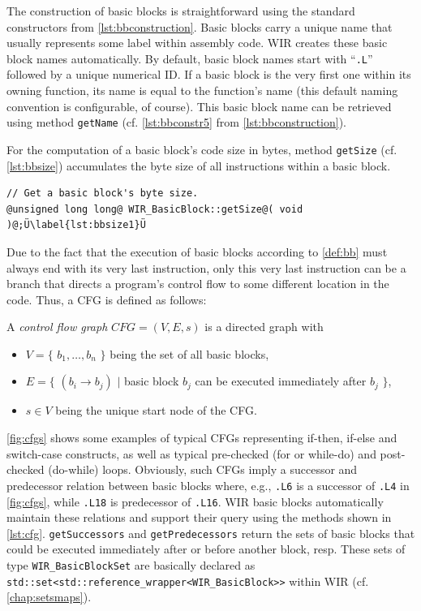 The construction of basic blocks is straightforward using the standard constructors from \cref{lst:bbconstruction}.
Basic blocks carry a unique name that usually represents some label within assembly code.
\gls{WIR} creates these basic block names automatically.
By default, basic block names start with ``\texttt{.L}'' followed by a unique numerical ID.
If a basic block is the very first one within its owning function, its name is equal to the function's name (this default naming convention is configurable, of course).
This basic block name can be retrieved using method \texttt{getName} (cf. \cref{lst:bbconstr5} from \cref{lst:bbconstruction}).

For the computation of a basic block's code size in bytes, method \texttt{getSize} (cf. \cref{lst:bbsize}) accumulates the byte size of all instructions within a basic block.

\begin{lstlisting}[style=code,float=h,caption={Size Computation by Class \texttt{WIR\_BasicBlock}},label=lst:bbsize]
// Get a basic block's byte size.
@unsigned long long@ WIR_BasicBlock::getSize@( void )@;Ü\label{lst:bbsize1}Ü
\end{lstlisting}

Due to the fact that the execution of basic blocks according to \cref{def:bb} must always end with its very last instruction, only this very last instruction can be a branch that directs a program's control flow to some different location in the code.
Thus, a \acrfull{CFG} is defined as follows:

\begin{definition} \label{def:cfg}
  A \emph{control flow graph} $\textit{CFG} = (V, E, s)$ is a directed graph with
  \begin{itemize}
    \item $V = \{$ $b_1, \dots, b_n$ $\}$ being the set of all basic blocks,
    \item $E = \{$ $(b_i \rightarrow b_j)$ $\vert$ basic block $b_j$ can be executed immediately after $b_j$ $\}$,
    \item $s \in V$ being the unique start node of the \gls{CFG}.
  \end{itemize}
\end{definition}

\cref{fig:cfgs} shows some examples of typical \glspl{CFG} representing if-then, if-else and switch-case constructs, as well as typical pre-checked (for or while-do) and post-checked (do-while) loops.
Obviously, such \glspl{CFG} imply a successor and predecessor relation between basic blocks where, e.g., \texttt{.L6} is a successor of \texttt{.L4} in \cref{fig:cfgs}, while \texttt{.L18} is predecessor of \texttt{.L16}.
\gls{WIR} basic blocks automatically maintain these relations and support their query using the methods shown in \cref{lst:cfg}.
\texttt{getSuccessors} and \texttt{getPredecessors} return the sets of basic blocks that could be executed immediately after or before another block, resp.
These sets of type \texttt{WIR\_BasicBlockSet} are basically declared as\label{def:bbset} \texttt{std::set<std::reference\_wrapper<WIR\_BasicBlock>{}>} within \gls{WIR} (cf. \cref{chap:setsmaps}).

